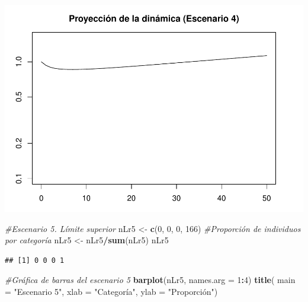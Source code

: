 \documentclass[
]{book}
\newenvironment{Shaded}{\begin{snugshade}}{\end{snugshade}}
\newcommand{\AttributeTok}[1]{\textcolor[rgb]{0.13,0.29,0.53}{#1}}
\newcommand{\CommentTok}[1]{\textcolor[rgb]{0.56,0.35,0.01}{\textit{#1}}}
\newcommand{\DecValTok}[1]{\textcolor[rgb]{0.00,0.00,0.81}{#1}}
\newcommand{\FunctionTok}[1]{\textcolor[rgb]{0.13,0.29,0.53}{\textbf{#1}}}
\newcommand{\NormalTok}[1]{#1}
\newcommand{\OtherTok}[1]{\textcolor[rgb]{0.56,0.35,0.01}{#1}}
\newcommand{\SpecialCharTok}[1]{\textcolor[rgb]{0.81,0.36,0.00}{\textbf{#1}}}
\newcommand{\StringTok}[1]{\textcolor[rgb]{0.31,0.60,0.02}{#1}}
\theoremstyle{definition}
\theoremstyle{definition}
\theoremstyle{definition}
\theoremstyle{definition}
\theoremstyle{remark}
\begin{document}
\includegraphics{Diagnostico_Poblacional_files/figure-latex/chap10_4-8.pdf}

\begin{Shaded}
\begin{Highlighting}[]
\CommentTok{\#Escenario 5. Límite superior}
\NormalTok{nLr5 }\OtherTok{\textless{}{-}} \FunctionTok{c}\NormalTok{(}\DecValTok{0}\NormalTok{, }\DecValTok{0}\NormalTok{, }\DecValTok{0}\NormalTok{, }\DecValTok{166}\NormalTok{)}
\CommentTok{\#Proporción de individuos por categoría}
\NormalTok{nLr5 }\OtherTok{\textless{}{-}}\NormalTok{ nLr5}\SpecialCharTok{/}\FunctionTok{sum}\NormalTok{(nLr5)}
\NormalTok{nLr5}
\end{Highlighting}
\end{Shaded}

\begin{verbatim}
## [1] 0 0 0 1
\end{verbatim}

\begin{Shaded}
\begin{Highlighting}[]
\CommentTok{\#Gráfica de barras del escenario 5 }
\FunctionTok{barplot}\NormalTok{(nLr5, }\AttributeTok{names.arg =} \DecValTok{1}\SpecialCharTok{:}\DecValTok{4}\NormalTok{)}
\FunctionTok{title}\NormalTok{( }\AttributeTok{main =} \StringTok{"Escenario 5"}\NormalTok{, }\AttributeTok{xlab =} \StringTok{"Categoría"}\NormalTok{, }\AttributeTok{ylab =} \StringTok{"Proporción"}\NormalTok{)}
\end{Highlighting}
\end{Shaded}
\end{document}
